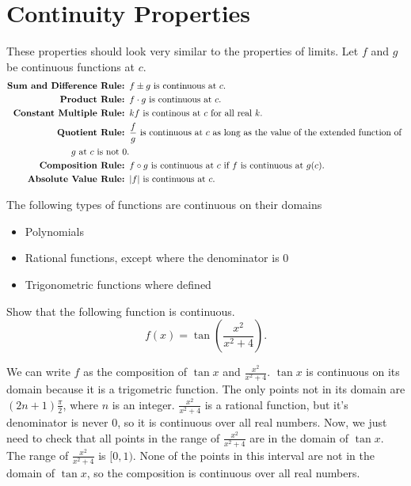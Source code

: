 \section{Continuity Properties}
These properties should look very similar to the properties of limits.
Let $f$ and $g$ be continuous functions at $c$.
\begin{align*}
	\textbf{Sum and Difference Rule: }& f \pm g \text{ is continuous at } c. \\
	\textbf{Product Rule: }& f \cdot g \text{ is continuous at } c. \\
	\textbf{Constant Multiple Rule: }& kf \text{ is continous at } c \text{ for all real } k. \\
	\textbf{Quotient Rule: }& \frac{f}{g} \text{ is continuous at } c \text{ as long as the value of the extended function of } \\
		g \text{ at } c \text{ is not } 0. \\
	\textbf{Composition Rule: }& f \circ g \text{ is continuous at } c \text{ if } f \text{ is continuous at } g(c). \\
	\textbf{Absolute Value Rule: }& \lvert f \rvert \text{ is continuous at } c.
\end{align*}

The following types of functions are continuous on their domains
\begin{itemize}
	\item Polynomials
	\item Rational functions, except where the denominator is 0
	\item Trigonometric functions where defined
\end{itemize}

\begin{example}
	Show that the following function is continuous.
	\begin{equation*}
		f(x) = \tan{\left(\frac{x^2}{x^2+4}\right)}.
	\end{equation*}
\end{example}
We can write $f$ as the composition of $\tan{x}$ and $\frac{x^2}{x^2+4}$.
$\tan{x}$ is continuous on its domain because it is a trigometric function.
The only points not in its domain are $(2n+1)\frac{\pi}{2}$, where $n$ is an integer.
$\frac{x^2}{x^2+4}$ is a rational function, but it's denominator is never $0$, so it is continuous over all real numbers.
Now, we just need to check that all points in the range of $\frac{x^2}{x^2+4}$ are in the domain of $\tan{x}$.
The range of $\frac{x^2}{x^2+4}$ is $[0,1)$.
None of the points in this interval are not in the domain of $\tan{x}$, so the composition is continuous over all real numbers.
